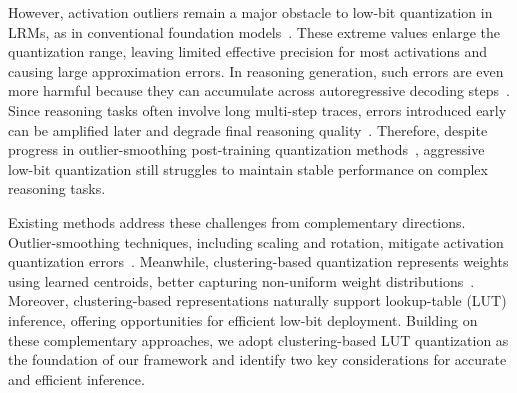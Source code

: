 \documentclass{article}
\begin{document}
However, activation outliers remain a major obstacle to low-bit quantization in LRMs, as in conventional foundation models~\cite{dettmers2022llmint88bitmatrixmultiplication,sun2024massiveactivationslargelanguage}. These extreme values enlarge the quantization range, leaving limited effective precision for most activations and causing large approximation errors. In reasoning generation, such errors are even more harmful because they can accumulate across autoregressive decoding steps~\cite{liu2025quantization,li2025quantizationmeetsreasoningexploring,liang2025paroquant}. Since reasoning tasks often involve long multi-step traces, errors introduced early can be amplified later and degrade final reasoning quality~\cite{zhao2025qspec,liu2025quantization}. Therefore, despite progress in outlier-smoothing post-training quantization methods~\cite{tseng2024quipbetterllmquantization,chee2024quip2bitquantizationlarge,ashkboos2024quarot,xiao2023smoothquant,xiang2024dfrot,liu2024spinquant,liang2025paroquant,yin2026codequant}, aggressive low-bit quantization still struggles to maintain stable performance on complex reasoning tasks.

Existing methods address these challenges from complementary directions. Outlier-smoothing techniques, including scaling and rotation, mitigate activation quantization errors~\cite{xiao2023smoothquant,ashkboos2024quarot,liu2024spinquant,liang2025paroquant}. Meanwhile, clustering-based quantization represents weights using learned centroids, better capturing non-uniform weight distributions~\cite{kim2023squeezellm,yin2026codequant}. Moreover, clustering-based representations naturally support lookup-table (LUT) inference, offering opportunities for efficient low-bit deployment. Building on these complementary approaches, we adopt clustering-based LUT quantization as the foundation of our framework and identify two key considerations for accurate and efficient inference.
\end{document}
